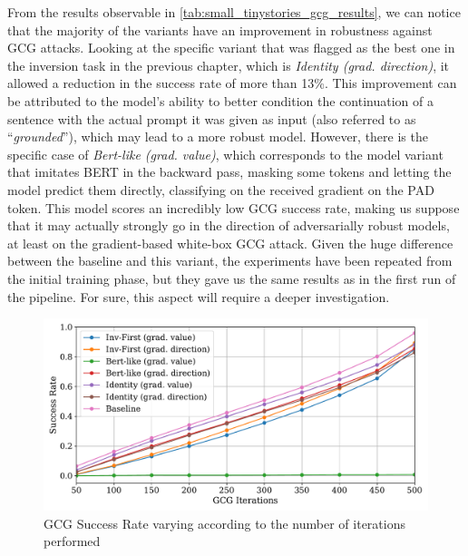 \documentclass[../thesis.tex]{subfiles}
\begin{document}
From the results observable in \cref{tab:small_tinystories_gcg_results}, we can notice that the majority of the variants have an improvement in robustness against GCG attacks.
Looking at the specific variant that was flagged as the best one in the inversion task in the previous chapter, which is \emph{Identity (grad. direction)}, it allowed a reduction in the success rate of more than 13\%. This improvement can be attributed to the model's ability to better condition the continuation of a sentence with the actual prompt it was given as input (also referred to as ``\emph{grounded}''), which may lead to a more robust model.
However, there is the specific case of \emph{Bert-like (grad. value)}, which corresponds to the model variant that imitates BERT in the backward pass, masking some tokens and letting the model predict them directly, classifying on the received gradient on the PAD token.
This model scores an incredibly low GCG success rate, making us suppose that it may actually strongly go in the direction of adversarially robust models, at least on the gradient-based white-box GCG attack. Given the huge difference between the baseline and this variant, the experiments have been repeated from the initial training phase, but they gave us the same results as in the first run of the pipeline. For sure, this aspect will require a deeper investigation.

\begin{figure}[htbp]
    \centering
    \includegraphics[width=0.9\linewidth]{assets/robustness/gcg_success_rate_varying_steps.pdf}
    \caption{GCG Success Rate varying according to the number of iterations performed}
    \label{fig:gcg_success_rate_varying_steps}
\end{figure}
\end{document}
